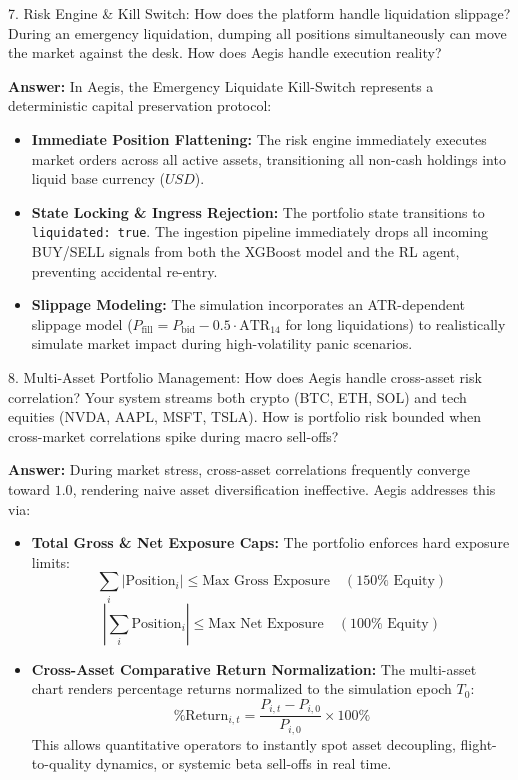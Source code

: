 \documentclass[11pt,a4paper]{article}
\begin{document}
\begin{questionbox}{7. Risk Engine \& Kill Switch: How does the platform handle liquidation slippage?}
During an emergency liquidation, dumping all positions simultaneously can move the market against the desk. How does Aegis handle execution reality?
\end{questionbox}
\begin{answerbox}
\textbf{Answer:} In Aegis, the Emergency Liquidate Kill-Switch represents a deterministic capital preservation protocol:
\begin{itemize}[leftmargin=1.5em]
  \item \textbf{Immediate Position Flattening:} The risk engine immediately executes market orders across all active assets, transitioning all non-cash holdings into liquid base currency ($USD$).
  \item \textbf{State Locking \& Ingress Rejection:} The portfolio state transitions to \texttt{liquidated: true}. The ingestion pipeline immediately drops all incoming BUY/SELL signals from both the XGBoost model and the RL agent, preventing accidental re-entry.
  \item \textbf{Slippage Modeling:} The simulation incorporates an ATR-dependent slippage model ($P_{\text{fill}} = P_{\text{bid}} - 0.5 \cdot \text{ATR}_{14}$ for long liquidations) to realistically simulate market impact during high-volatility panic scenarios.
\end{itemize}
\end{answerbox}

\vspace{0.4em}

\begin{questionbox}{8. Multi-Asset Portfolio Management: How does Aegis handle cross-asset risk correlation?}
Your system streams both crypto (BTC, ETH, SOL) and tech equities (NVDA, AAPL, MSFT, TSLA). How is portfolio risk bounded when cross-market correlations spike during macro sell-offs?
\end{questionbox}
\begin{answerbox}
\textbf{Answer:} During market stress, cross-asset correlations frequently converge toward $1.0$, rendering naive asset diversification ineffective. Aegis addresses this via:
\begin{itemize}[leftmargin=1.5em]
  \item \textbf{Total Gross \& Net Exposure Caps:} The portfolio enforces hard exposure limits:
  $$\sum_{i} |\text{Position}_i| \le \text{Max Gross Exposure} \quad (150\% \text{ Equity})$$
  $$\left| \sum_{i} \text{Position}_i \right| \le \text{Max Net Exposure} \quad (100\% \text{ Equity})$$
  \item \textbf{Cross-Asset Comparative Return Normalization:} The multi-asset chart renders percentage returns normalized to the simulation epoch $T_0$:
  $$\% \text{Return}_{i, t} = \frac{P_{i, t} - P_{i, 0}}{P_{i, 0}} \times 100\%$$
  This allows quantitative operators to instantly spot asset decoupling, flight-to-quality dynamics, or systemic beta sell-offs in real time.
\end{itemize}
\end{answerbox}
\end{document}
